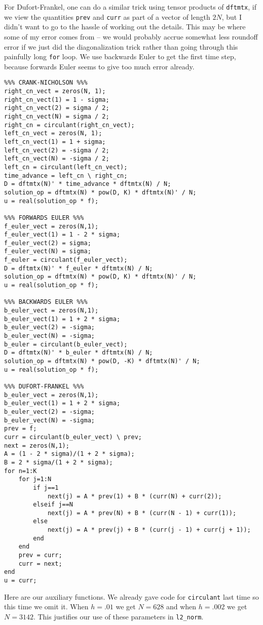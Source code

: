 \documentclass[10pt]{article}
\theoremstyle{definition}
\begin{document}
For Dufort-Frankel, one can do a similar trick using tensor products of \verb+dftmtx+, if we view the quantities \verb+prev+ and \verb+curr+ as part of a vector of length $2N$, but I didn't want to go to the hassle of working out the details.
This may be where some of my error comes from -- we would probably accrue somewhat less roundoff error if we just did the diagonalization trick rather than going through this painfully long \verb+for+ loop.
We use backwards Euler to get the first time step, because forwards Euler seems to give too much error already.

\begin{verbatim}
%%% CRANK-NICHOLSON %%%
right_cn_vect = zeros(N, 1);
right_cn_vect(1) = 1 - sigma;
right_cn_vect(2) = sigma / 2;
right_cn_vect(N) = sigma / 2;
right_cn = circulant(right_cn_vect);
left_cn_vect = zeros(N, 1);
left_cn_vect(1) = 1 + sigma;
left_cn_vect(2) = -sigma / 2;
left_cn_vect(N) = -sigma / 2;
left_cn = circulant(left_cn_vect);
time_advance = left_cn \ right_cn;
D = dftmtx(N)' * time_advance * dftmtx(N) / N;
solution_op = dftmtx(N) * pow(D, K) * dftmtx(N)' / N;
u = real(solution_op * f);

%%% FORWARDS EULER %%%
f_euler_vect = zeros(N,1);
f_euler_vect(1) = 1 - 2 * sigma;
f_euler_vect(2) = sigma;
f_euler_vect(N) = sigma;
f_euler = circulant(f_euler_vect);
D = dftmtx(N)' * f_euler * dftmtx(N) / N;
solution_op = dftmtx(N) * pow(D, K) * dftmtx(N)' / N;
u = real(solution_op * f);

%%% BACKWARDS EULER %%%
b_euler_vect = zeros(N,1);
b_euler_vect(1) = 1 + 2 * sigma;
b_euler_vect(2) = -sigma;
b_euler_vect(N) = -sigma;
b_euler = circulant(b_euler_vect);
D = dftmtx(N)' * b_euler * dftmtx(N) / N;
solution_op = dftmtx(N) * pow(D, -K) * dftmtx(N)' / N;
u = real(solution_op * f);

%%% DUFORT-FRANKEL %%%
b_euler_vect = zeros(N,1);
b_euler_vect(1) = 1 + 2 * sigma;
b_euler_vect(2) = -sigma;
b_euler_vect(N) = -sigma;
prev = f;
curr = circulant(b_euler_vect) \ prev;
next = zeros(N,1);
A = (1 - 2 * sigma)/(1 + 2 * sigma);
B = 2 * sigma/(1 + 2 * sigma);
for n=1:K
    for j=1:N
        if j==1
            next(j) = A * prev(1) + B * (curr(N) + curr(2));
        elseif j==N
            next(j) = A * prev(N) + B * (curr(N - 1) + curr(1));
        else
            next(j) = A * prev(j) + B * (curr(j - 1) + curr(j + 1));
        end
    end
    prev = curr;
    curr = next;
end
u = curr;
\end{verbatim}

Here are our auxiliary functions. We already gave code for \verb+circulant+ last time so this time we omit it.
When $h = .01$ we get $N = 628$ and when $h = .002$ we get $N = 3142$.
This justifies our use of these parameters in \verb+l2_norm+.
\end{document}
